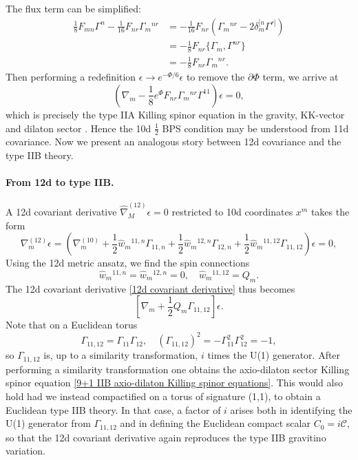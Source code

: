 The flux term can be simplified:
\begin{equation}
\begin{aligned}
\frac{1}{8}F_{mn}\Gamma^n - \frac{1}{16}F_{nr}\Gamma_m{}^{nr}
&= -\frac{1}{16}F_{nr}(\Gamma_m{}^{nr} - 2\delta_m^{[n}\Gamma^{r]})\\
&= - \frac{1}{8}F_{nr}\{\Gamma_m,\Gamma^{nr}\}\\
&= - \frac{1}{8} F_{nr} \Gamma_m{}^{nr}.
\end{aligned}
\end{equation}
Then performing a redefinition $\epsilon \to e^{-\Phi/6} \epsilon$ to remove the $\partial\Phi$ term, we arrive at
\begin{equation}
\left(
\nabla_m - \frac{1}{8}e^\Phi F_{nr} \Gamma_m{}^{nr}\Gamma^{11}
\right)\epsilon = 0,
\end{equation}
which is precisely the type IIA Killing spinor equation in the gravity, KK-vector and dilaton sector \cite{Becker:2006dvp}.
Hence the 10d $\tfrac{1}{2}$ BPS condition may be understood from 11d covariance.
Now we present an analogous story between 12d covariance and the type IIB theory.

\paragraph{From 12d to type IIB.}
A 12d covariant derivative $\widehat{\nabla}^{(12)}_M\epsilon = 0$ restricted to 10d coordinates $x^m$ takes the form
\begin{equation}
\nabla^{(12)}_m\epsilon
=\left(
\nabla^{(10)}_m
+\frac{1}{2}\widehat{w}_m{}^{11,n}\Gamma_{11,n}
+\frac{1}{2}\widehat{w}_m{}^{12,n}\Gamma_{12,n}
+\frac{1}{2}\widehat{w}_m{}^{11,12}\Gamma_{11,12}\right)\epsilon = 0,
\label{12d covariant derivative}
\end{equation}
Using the 12d metric ansatz, we find the spin connections
\begin{equation}
\widehat{w}_m{}^{11,n}=\widehat{w}_m{}^{12,n}=0,\quad
\widehat{w}_m{}^{11,12} =Q_m.
\end{equation}
The 12d covariant derivative \eqref{12d covariant derivative} thus becomes
\begin{equation}
\left[
\nabla_m + \frac{1}{2} Q_m \Gamma_{11,12}
\right]\epsilon.
\end{equation}
Note that on a Euclidean torus
\begin{equation}
\Gamma_{11,12} = \Gamma_{11}\Gamma_{12},\quad
(\Gamma_{11,12})^2 =-\Gamma_{11}^2\Gamma_{12}^2 = -1,
\end{equation}
so $\Gamma_{11,12}$ is, up to a similarity transformation, $i$ times the U(1) generator.
After performing a similarity transformation one obtains the axio-dilaton sector Killing spinor equation \eqref{9+1 IIB axio-dilaton Killing spinor equations}.
This would also hold had we instead compactified on a torus of signature (1,1), to obtain a Euclidean type IIB theory.
In that case, a factor of $i$ arises both in identifying the U(1) generator from $\Gamma_{11,12}$ and in defining the Euclidean compact scalar $C_0 = i\mathcal C$, so that the 12d covariant derivative again reproduces the type IIB gravitino variation.
